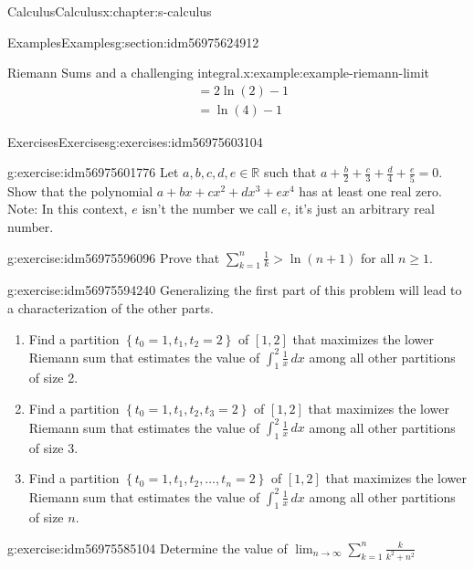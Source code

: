 \documentclass[twoside,10pt,]{book}
\numberwithin{equation}{section}
\begin{document}
\begin{chapterptx}{Calculus}{}{Calculus}{}{}{x:chapter:s-calculus}
\begin{sectionptx}{Examples}{}{Examples}{}{}{g:section:idm56975624912}
\begin{example}{Riemann Sums and a challenging integral.}{x:example:example-riemann-limit}
\begin{equation*}
\begin{split}
& = 2 \ln(2) - 1\\
& = \ln(4) - 1
\end{split}
\end{equation*}
%
\end{example}
\end{sectionptx}
%
%
\typeout{************************************************}
\typeout{************************************************}
%
\begin{exercises-section}{Exercises}{}{Exercises}{}{}{g:exercises:idm56975603104}
\begin{divisionexercise}{1}{}{}{g:exercise:idm56975601776}%
Let \(a,b,c,d,e \in \mathbb{R}\) such that \(a + \frac{b}{2} + \frac{c}{3} + \frac{d}{4} + \frac{e}{5} = 0\). Show that the polynomial \(a+bx+c x^2 +d x^3 +e x^4\) has at least one real zero. Note: In this context, \(e\) isn't the number we call \(e\), it's just an arbitrary real number.%
\end{divisionexercise}%
\begin{divisionexercise}{2}{}{}{g:exercise:idm56975596096}%
Prove that \(\sum _{k=1}^n \frac{1}{k}>\ln  (n+1)\)  for all \(n\geq 1\).%
\end{divisionexercise}%
\begin{divisionexercise}{3}{}{}{g:exercise:idm56975594240}%
Generalizing the first part of this problem will lead to a characterization of the other parts.%
\begin{enumerate}[label=(\alph*)]
\item{}Find a partition \(\left\{t_0=1,t_1,t_2=2\right\}\) of \([1,2]\) that maximizes the lower Riemann sum that estimates the value of \(\int_1^2 \frac{1}{x} \, dx\) among all other partitions of size 2.%
\item{}Find a partition \(\left\{t_0=1,t_1,t_2,t_3=2\right\}\) of \([1,2]\) that maximizes the lower Riemann sum that estimates the value of \(\int_1^2 \frac{1}{x} \, dx\) among all other partitions of size 3.%
\item{}Find a partition \(\left\{t_0=1,t_1,t_2,\ldots , t_n=2\right\}\) of \([1,2]\) that maximizes the lower Riemann sum that estimates the value of \(\int_1^2 \frac{1}{x} \, dx\) among all other partitions of size \(n\).%
\end{enumerate}
%
\end{divisionexercise}%
\begin{divisionexercise}{4}{}{}{g:exercise:idm56975585104}%
Determine the value of \(\lim _{n\to \infty }\sum _{k=1}^n \frac{k}{k^2+n^2}\)%

\end{divisionexercise}
\end{exercises-section}
\end{chapterptx}
\end{document}
